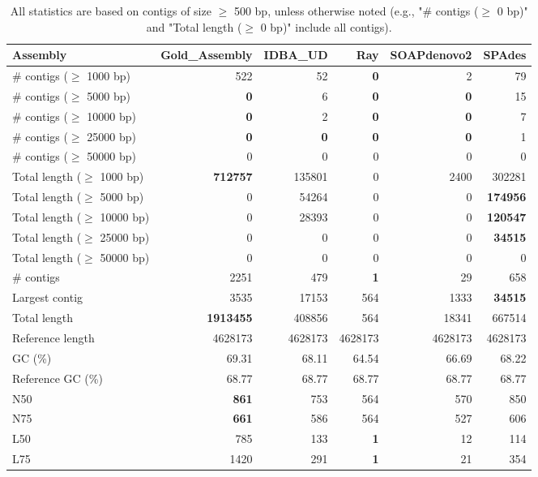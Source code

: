 \documentclass[12pt,a4paper]{article}
\begin{document}
\begin{table}[ht]
\begin{center}
\caption{All statistics are based on contigs of size $\geq$ 500 bp, unless otherwise noted (e.g., "\# contigs ($\geq$ 0 bp)" and "Total length ($\geq$ 0 bp)" include all contigs).}
\begin{tabular}{|l*{5}{|r}|}
\hline
Assembly & Gold\_Assembly & IDBA\_UD & Ray & SOAPdenovo2 & SPAdes \\ \hline
\# contigs ($\geq$ 1000 bp) & 522 & 52 & {\bf 0} & 2 & 79 \\ \hline
\# contigs ($\geq$ 5000 bp) & {\bf 0} & 6 & {\bf 0} & {\bf 0} & 15 \\ \hline
\# contigs ($\geq$ 10000 bp) & {\bf 0} & 2 & {\bf 0} & {\bf 0} & 7 \\ \hline
\# contigs ($\geq$ 25000 bp) & {\bf 0} & {\bf 0} & {\bf 0} & {\bf 0} & 1 \\ \hline
\# contigs ($\geq$ 50000 bp) & 0 & 0 & 0 & 0 & 0 \\ \hline
Total length ($\geq$ 1000 bp) & {\bf 712757} & 135801 & 0 & 2400 & 302281 \\ \hline
Total length ($\geq$ 5000 bp) & 0 & 54264 & 0 & 0 & {\bf 174956} \\ \hline
Total length ($\geq$ 10000 bp) & 0 & 28393 & 0 & 0 & {\bf 120547} \\ \hline
Total length ($\geq$ 25000 bp) & 0 & 0 & 0 & 0 & {\bf 34515} \\ \hline
Total length ($\geq$ 50000 bp) & 0 & 0 & 0 & 0 & 0 \\ \hline
\# contigs & 2251 & 479 & {\bf 1} & 29 & 658 \\ \hline
Largest contig & 3535 & 17153 & 564 & 1333 & {\bf 34515} \\ \hline
Total length & {\bf 1913455} & 408856 & 564 & 18341 & 667514 \\ \hline
Reference length & 4628173 & 4628173 & 4628173 & 4628173 & 4628173 \\ \hline
GC (\%) & 69.31 & 68.11 & 64.54 & 66.69 & 68.22 \\ \hline
Reference GC (\%) & 68.77 & 68.77 & 68.77 & 68.77 & 68.77 \\ \hline
N50 & {\bf 861} & 753 & 564 & 570 & 850 \\ \hline
N75 & {\bf 661} & 586 & 564 & 527 & 606 \\ \hline
L50 & 785 & 133 & {\bf 1} & 12 & 114 \\ \hline
L75 & 1420 & 291 & {\bf 1} & 21 & 354 \\ \hline

\end{tabular}
\end{center}
\end{table}
\end{document}
